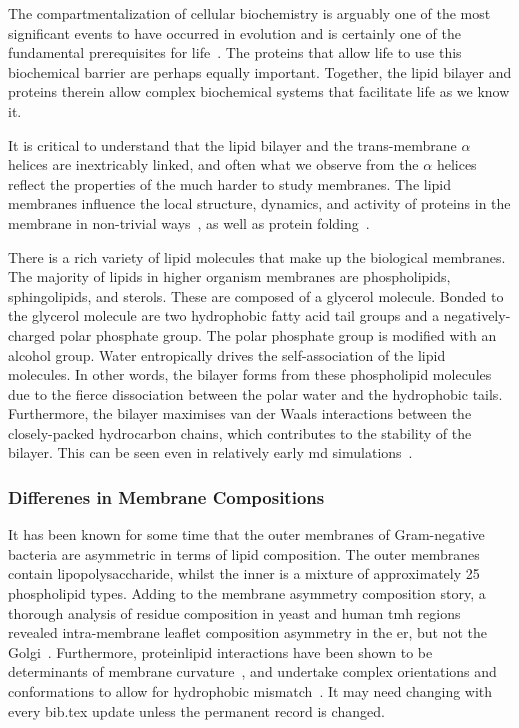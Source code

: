 The compartmentalization of cellular biochemistry is arguably one of the most significant events to have occurred in evolution and is certainly one of the fundamental prerequisites for life~\cite{Koshland2002}.
 The proteins that allow life to use this biochemical barrier are perhaps equally important.
Together, the lipid bilayer and proteins therein allow complex biochemical systems that facilitate life as we know it.

It is critical to understand that the lipid bilayer and the trans-membrane $\alpha$ helices are inextricably linked, and often what we observe from the $\alpha$ helices reflect the properties of the much harder to study membranes.
The lipid membranes influence the local structure, dynamics, and activity of proteins in the membrane in non-trivial ways~\cite{Bondar2010, Bondar2009, Jardon-Valadez2010, Kalvodova2005, Urban2005, White2001a, Jensen2004, Henin2014}, as well as protein folding~\cite{Kauko2010}.

There is a rich variety of lipid molecules that make up the biological membranes.
The majority of lipids in higher organism membranes are phospholipids, sphingolipids, and sterols.
These are composed of a glycerol molecule.
Bonded to the glycerol molecule are two hydrophobic fatty acid tail groups and a negatively-charged polar phosphate group.
The polar phosphate group is modified with an alcohol group.
Water entropically drives the self-association of the lipid molecules.
In other words, the bilayer forms from these phospholipid molecules due to the fierce dissociation between the polar water and the hydrophobic tails.
Furthermore, the bilayer maximises van der Waals interactions between the closely-packed hydrocarbon chains, which contributes to the stability of the bilayer.
This can be seen even in relatively early \gls{md} simulations~\cite{Goetz1998}.

\subsubsection{Differenes in Membrane Compositions}

It has been known for some time that the outer membranes of Gram-negative bacteria are asymmetric in terms of lipid composition.
The outer membranes contain lipopolysaccharide, whilst the inner is a mixture of approximately 25 phospholipid types.
Adding to the membrane asymmetry composition story, a thorough analysis of residue composition in yeast and human \gls{tmh} regions revealed intra-membrane leaflet composition asymmetry in the \gls{er}, but not the Golgi~\cite{Sharpe2010}.
Furthermore, protein\-lipid interactions have been shown to be determinants of membrane curvature~\cite{Jensen2004}, and undertake complex orientations and conformations to allow for hydrophobic mismatch~\cite{Planque2003}.
It may need changing with every bib.tex update unless the permanent record is changed.

